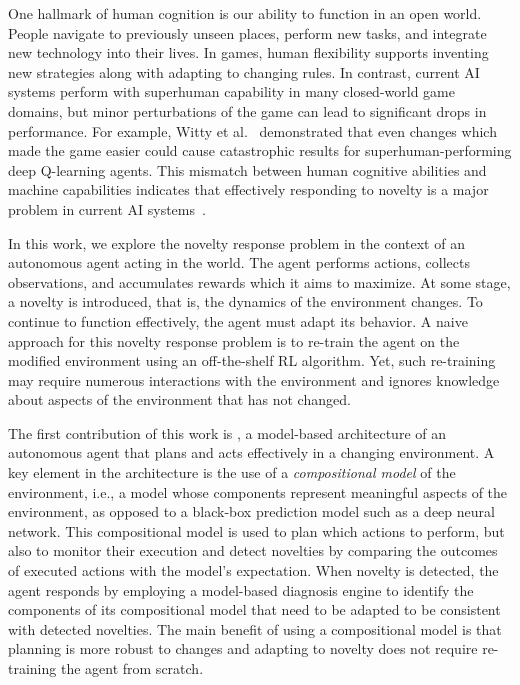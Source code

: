 \documentclass{article}
\begin{document}
One hallmark of human cognition is our ability to function in an open world. 
People navigate to previously unseen places, perform new tasks, and integrate new technology into their lives. In games, human flexibility supports inventing new strategies along with adapting to changing rules. 
In contrast, current AI systems perform with superhuman capability in many closed-world game domains, but minor perturbations of the game can lead to significant drops in performance. 
For example, Witty et al.~ demonstrated that even changes which made the game easier could cause catastrophic results for superhuman-performing deep Q-learning agents. 
This mismatch between human cognitive abilities and machine capabilities indicates that effectively responding to novelty is a major problem in current AI systems~\cite{senator2019sailon}. 


In this work, we explore the novelty response problem in the context of an autonomous agent acting in the world. 
The agent performs actions, collects observations, and accumulates rewards which it aims to maximize. 
At some stage, a novelty is introduced, that is, the dynamics of the environment changes. 
To continue to function effectively, the agent must adapt its behavior. 
A naive approach for this novelty response problem is to re-train the agent on the modified environment using an off-the-shelf RL algorithm. 
Yet, such re-training may require numerous interactions with the environment and ignores knowledge about aspects of the environment that has not changed. 


The first contribution of this work is \hydra, a model-based architecture of an autonomous agent that plans and acts effectively in a changing environment. 
A key element in the \hydra architecture is the use of a \emph{compositional model} of the environment, i.e., a model whose components represent meaningful aspects of the environment, as opposed to a black-box prediction model such as a deep neural network. 
This compositional model is used to plan which actions to perform, but also to monitor their execution and detect novelties by comparing the outcomes of executed actions with the model's expectation. 
When novelty is detected, the \hydra agent responds by employing a model-based diagnosis engine to identify the components of its compositional model that need to be adapted to be consistent with detected novelties. 
The main benefit of using a compositional model is that planning is more robust to changes and adapting to novelty does not require re-training the agent from scratch. 
\end{document}
